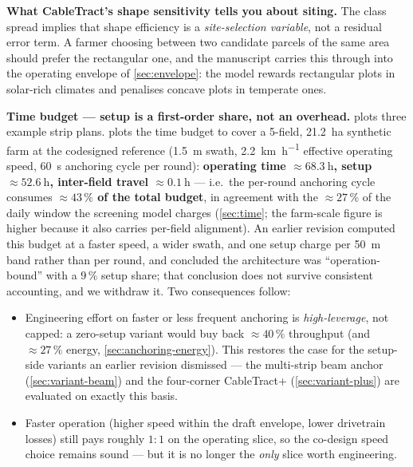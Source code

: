 \documentclass[11pt,a4paper]{article}
\begin{document}
\textbf{What CableTract's shape sensitivity tells you about siting.} The class spread implies that shape efficiency is a \emph{site-selection variable}, not a residual error term. A farmer choosing between two candidate parcels of the same area should prefer the rectangular one, and the manuscript carries this through into the operating envelope of \cref{sec:envelope}: the model rewards rectangular plots in solar-rich climates and penalises concave plots in temperate ones.

\textbf{Time budget --- setup is a first-order share, not an overhead.}  plots three example strip plans.  plots the time budget to cover a 5-field, \SI{21.2}{\hectare} synthetic farm at the codesigned reference (\SI{1.5}{\meter} swath, \SI{2.2}{\kilo\meter\per\hour} effective operating speed, \SI{60}{\second} anchoring cycle per round): \textbf{operating time ${\approx}\SI{68.3}{\hour}$, setup ${\approx}\SI{52.6}{\hour}$, inter-field travel ${\approx}\SI{0.1}{\hour}$} --- i.e.\ the per-round anchoring cycle consumes \textbf{${\approx}43\,\%$ of the total budget}, in agreement with the ${\approx}27\,\%$ of the daily window the screening model charges (\cref{sec:time}; the farm-scale figure is higher because it also carries per-field alignment). An earlier revision computed this budget at a faster speed, a wider swath, and one setup charge per \SI{50}{\meter} band rather than per round, and concluded the architecture was ``operation-bound'' with a 9\,\% setup share; that conclusion does not survive consistent accounting, and we withdraw it. Two consequences follow:
\begin{itemize}[leftmargin=1.6em,itemsep=0.15em]
    \item Engineering effort on faster or less frequent anchoring is \emph{high-leverage}, not capped: a zero-setup variant would buy back ${\approx}40\,\%$ throughput (and ${\approx}27\,\%$ energy, \cref{sec:anchoring-energy}). This restores the case for the setup-side variants an earlier revision dismissed --- the multi-strip beam anchor (\cref{sec:variant-beam}) and the four-corner CableTract+ (\cref{sec:variant-plus}) are evaluated on exactly this basis.
    \item Faster operation (higher speed within the draft envelope, lower drivetrain losses) still pays roughly $1{:}1$ on the operating slice, so the co-design speed choice remains sound --- but it is no longer the \emph{only} slice worth engineering.
\end{itemize}
\end{document}

